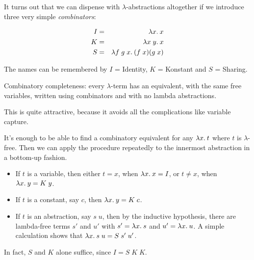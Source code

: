 \begin{slide*}


\vspace*{0.5cm}

It turns out that we can dispense with $\lambda$-abstractions altogether if we
introduce three very simple {\em combinators}:

\begin{red}
\begin{eqnarray*}
I & = & \lambda x.\: x                              \\
K & = & \lambda x\; y.\: x                          \\
S & = & \lambda f\; g\; x.\: (f\; x)(g\; x)
\end{eqnarray*}
\end{red}

The names can be remembered by {\red $I$} = Identity, {\red $K$} = Konstant and
{\red $S$} = Sharing.

Combinatory completeness: every $\lambda$-term has an equivalent, with the same
free variables, written using combinators and with no lambda abstractions.

This is quite attractive, because it avoids all the complications like variable
capture.

\end{slide*}


\begin{slide*}


\vspace*{0.5cm}

It's enough to be able to find a combinatory equivalent for any {\red $\lambda x.\:
t$} where {\red $t$} is {\red $\lambda$}-free. Then we can apply the procedure
repeatedly to the innermost abstraction in a bottom-up fashion.

\begin{itemize}

\item If {\red $t$} is a variable, then either {\red $t = x$}, when {\red
$\lambda x.\: x = I$}, or {\red $t \not= x$}, when {\red $\lambda x.\: y = K\; y$}.

\item If {\red $t$} is a constant, say {\red $c$}, then {\red $\lambda x.\: y = K\;
c$}.


\item If {\red $t$} is an abstraction, say {\red $s\; u$}, then by the
inductive hypothesis, there are lambda-free terms {\red $s'$} and {\red $u'$}
with {\red $s' = \lambda x.\: s$} and {\red $u' = \lambda x.\: u$}. A simple calculation
shows that {\red $\lambda x.\: s\; u = S\;s'\;u'$}.

\end{itemize}

In fact, {\red $S$} and {\red $K$} alone suffice, since {\red $I = S\; K\; K$}.

\end{slide*}





